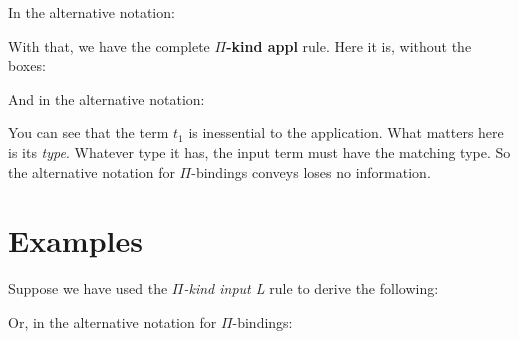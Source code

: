 \documentclass{book}
\numberwithin{equation}{chapter}
\newcommand{\vocab}{\textbf}
\begin{document}
\noindent
In the alternative notation:

\begin{prooftree}
\end{prooftree}

\noindent
With that, we have the complete \vocab{$\Pi$-kind appl} rule. Here it is, without the boxes:

\begin{prooftree}
\end{prooftree}

\noindent
And in the alternative notation:

\begin{prooftree}
\end{prooftree}

\noindent
You can see that the term $t_{1}$ is inessential to the application. What matters here is its \textit{type}. Whatever type it has, the input term must have the matching type. So the alternative notation for $\Pi$-bindings conveys loses no information.


\section{Examples}

\noindent
Suppose we have used the \textit{$\Pi$-kind input L} rule to derive the following:

\begin{prooftree}
\end{prooftree}

\noindent
Or, in the alternative notation for $\Pi$-bindings:

\begin{prooftree}
\end{prooftree}
\end{document}

